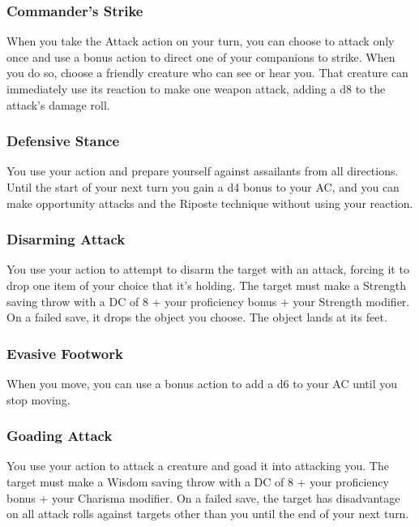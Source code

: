 \subsubsection{Commander's Strike} \label{tec::commandersstrike}
When you take the Attack action on your turn, you can choose to attack only once and use a bonus action to direct one of your companions to strike.
When you do so, choose a friendly creature who can see or hear you.
That creature can immediately use its reaction to make one weapon attack, adding a d8 to the attack's damage roll.

\subsubsection{Defensive Stance} \label{tec::defensivestance}
You use your action and prepare yourself against assailants from all directions.
Until the start of your next turn you gain a d4 bonus to your AC, and you can make opportunity attacks and the Riposte technique without using your reaction.

\subsubsection{Disarming Attack} \label{tec::disarmingattack}
You use your action to attempt to disarm the target with an attack, forcing it to drop one item of your choice that it's holding.
The target must make a Strength saving throw with a DC of 8 + your proficiency bonus + your Strength modifier.
On a failed save, it drops the object you choose.
The object lands at its feet.

\subsubsection{Evasive Footwork} \label{tec::evasivefootwork}
When you move, you can use a bonus action to add a d6 to your AC until you stop moving.

\subsubsection{Goading Attack} \label{tec::goadingattack}
You use your action to attack a creature and goad it into attacking you.
The target must make a Wisdom saving throw with a DC of 8 + your proficiency bonus + your Charisma modifier.
On a failed save, the target has disadvantage on all attack rolls against targets other than you until the end of your next turn.


